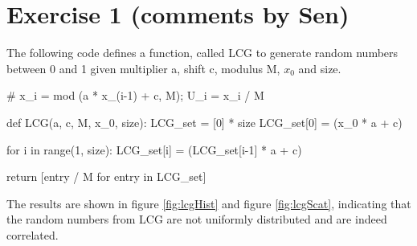 \newpage
\section*{Exercise 1 (comments by Sen)}
The following code defines a function, called LCG to generate random numbers between 0 and 1 given multiplier a, shift c, modulus M, $x_0$ and size.

\begin{python}
# x_i = mod (a * x_(i-1) + c, M);  U_i = x_i / M

def LCG(a, c, M, x_0, size):
    LCG_set = [0] * size
    LCG_set[0] = (x_0 * a + c) %
    
    for i in range(1, size):
        LCG_set[i] = (LCG_set[i-1] * a + c) %
        
    return [entry / M for entry in LCG_set] 
\end{python}

The results are shown in figure \ref{fig:lcgHist} and figure \ref{fig:lcgScat}, indicating that the random numbers from LCG are not uniformly distributed and are indeed correlated.

